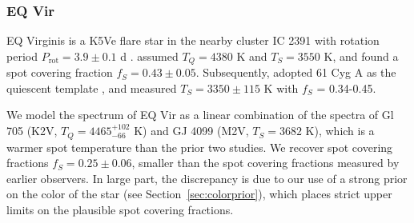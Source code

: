 \subsubsection{EQ Vir} \label{sec:eqvir}


EQ Virginis is a K5Ve flare star in the nearby cluster IC 2391 
\citep[50 Myr;][]{Barrado2004}
with rotation period $P_\mathrm{rot} = 3.9 \pm 0.1$ d \citep{Montes2001,Paulson2006,Suarez2016}.  \citet{saar2001} assumed $T_Q = 4380$ K and $T_S = 3550$ K, and found a spot covering fraction $f_S = 0.43 \pm 0.05$. Subsequently, \citet{ONeal2004} 
adopted 61 Cyg A as the quiescent template 
\citep[\teff = 4374 K;][]{Heiter2015}, and 
measured $T_S = 3350 \pm 115$ K with $f_S$ = 0.34-0.45.

We model the spectrum of EQ Vir as a linear combination of the spectra of Gl 705 (K2V, $T_Q = 4465^{+102}_{-66}$ K) and GJ 4099 (M2V, $T_S = 3682$ K), 
which is a warmer spot temperature than the prior two studies. 
We recover spot covering fractions $f_S = 0.25 \pm 0.06$, smaller than the spot covering fractions measured by earlier observers. In large part, the discrepancy is due to our use of a strong prior on the color of the star (see Section~\ref{sec:colorprior}), which places strict upper limits on the plausible spot covering fractions.


